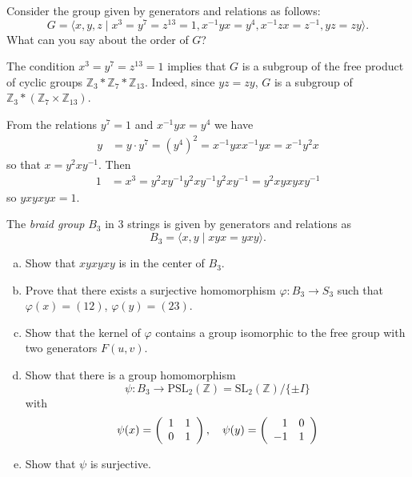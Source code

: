 \documentclass{article}
\newcounter{Problem}
\newenvironment{Problem}{\begin{Exercise}[name={Problem},
                                          counter={Problem}]}
                        {\end{Exercise}}
\begin{document}
\begin{Problem}
Consider the group given by generators and relations as follows:
$$
G = \langle
      x, y, z
    \mid
      x^3 = y^7 = z^{13} = 1,
      x^{-1} y x = y^4,
      x^{-1} z x = z^{-1},
      yz = zy
    \rangle.
$$
What can you say about the order of $G$?
\end{Problem}

\begin{Answer}
The condition $x^3 = y^7 = z^{13} = 1$ implies that
$G$ is a subgroup of the free product of cyclic groups
$\mathbb{Z}_3 \ast \mathbb{Z}_7 \ast \mathbb{Z}_{13}$. Indeed,
since $yz = zy$, $G$ is a subgroup of
$\mathbb{Z}_3 \ast (\mathbb{Z}_7 \times \mathbb{Z}_{13})$.

From the relations $y^7 = 1$ and $x^{-1} y x = y^4$ we have
\begin{align*}
   y
&= y \cdot y^7
 = (y^4)^2
 = x^{-1} y x x^{-1} y x
 = x^{-1} y^2 x
\end{align*}
so that $x = y^2 x y^{-1}$. Then
\begin{align*}
   1
&= x^3
 = y^2 x y^{-1} y^2 x y^{-1} y^2 x y^{-1}
 = y^2 x y x y x y^{-1}
\end{align*}
so $yxyxyx = 1$.
\end{Answer}

\pagebreak

\begin{Problem}
The \emph{braid group} $B_3$ in 3 strings is given by generators and
relations as
$$
B_3 = \langle x, y \mid xyx = yxy \rangle.
$$

\begin{enumerate}[(a)]
  \item{
    Show that $xyxyxy$ is in the center of $B_3$.
  }
  \item{
    Prove that there exists a surjective homomorphism
    $\varphi : B_3 \to S_3$ such that $\varphi(x) = (12)$,
    $\varphi(y) = (23)$.
  }
  \item{
    Show that the kernel of $\varphi$ contains a group isomorphic to
    the free group with two generators $F(u,v)$.
  }
  \item{
    Show that there is a group homomorphism
    $$
    \psi : B_3
       \to \mathrm{PSL}_2(\mathbb{Z})
         = \mathrm{SL}_2(\mathbb{Z}) / \{ \pm I \}
    $$
    with
    $$
    \psi(x) =
    \left(\begin{array}{r r}
      1 & 1 \\
      0 & 1
    \end{array}\right), \quad
    \psi(y) =
    \left(\begin{array}{r r}
      1 & 0 \\
     -1 & 1
    \end{array}\right)
    $$
  }
  \item{
    Show that $\psi$ is surjective.
  }
\end{enumerate}

\end{Problem}
\end{document}
